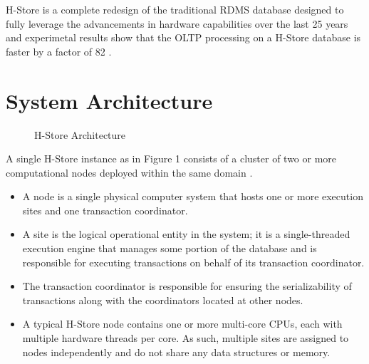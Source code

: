 \documentclass[9pt,twocolumn,twoside]{../../styles/osajnl}
\begin{document}
H-Store is a complete redesign of the traditional RDMS database designed to fully leverage the advancements in hardware capabilities over the last 25 years and 
experimetal results show that the OLTP processing on a H-Store database is 
faster 
by a factor of 82 \cite{stonebraker2007}.

\section{System Architecture}

\begin{figure}[http]
\centering
\graphicspath{ {images/} }
\caption{H-Store Architecture} \cite{www-H-StoreArch}
\label{fig:false-color}
\end{figure}

A single H-Store instance as in Figure 1 consists of a cluster 
of two or more computational nodes deployed within the same domain \cite{www-H-StoreArch}. 
\begin{itemize}
\item A node is a single physical computer system that hosts one or more execution sites and one transaction coordinator. 
\item A site is the logical operational entity in the system; it is a single-threaded 
execution engine that manages some portion of the database and is responsible 
for executing transactions on behalf of its transaction coordinator. 
\item The transaction coordinator is responsible for ensuring the serializability of 
transactions along with the coordinators located at other nodes.
\item A typical H-Store node contains one or more multi-core CPUs, each with multiple hardware 
threads per core. As such, multiple sites are assigned to nodes independently 
and do not share any data structures or memory.
\end{itemize}
\end{document}
